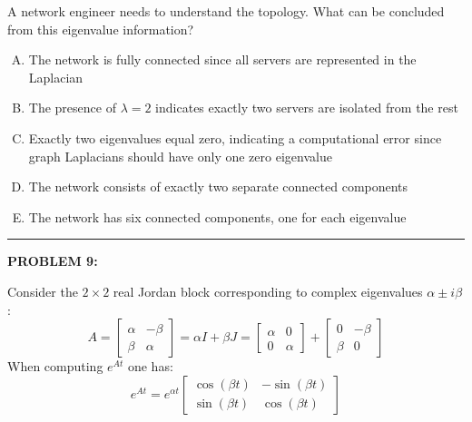 \documentclass[12pt]{amsart}
\newcommand{\divider}{
  \vspace{-1em} %
  \noindent
  \raisebox{-0.15ex}{\textbullet}%
  \hspace{0.5em}%
  \rule[0.5ex]{0.95\textwidth}{1.0pt}%
  \hspace{0.5em}%
  \raisebox{-0.15ex}{\textbullet}%
  \vspace{0em} %
}
\begin{document}
A network engineer needs to understand the topology. What can be concluded from this eigenvalue information?

\begin{enumerate}[(A)]
\item The network is fully connected since all servers are represented in the Laplacian
\item The presence of $\lambda = 2$ indicates exactly two servers are isolated from the rest
\item Exactly two eigenvalues equal zero, indicating a computational error since graph Laplacians should have only one zero eigenvalue
\item The network consists of exactly two separate connected components
\item The network has six connected components, one for each eigenvalue
\end{enumerate}


\divider

{\bf PROBLEM 9:}

Consider the $2 \times 2$ real Jordan block corresponding to complex eigenvalues $\alpha \pm i\beta$:
$$A = \begin{bmatrix} \alpha & -\beta \\ \beta & \alpha \end{bmatrix} = \alpha I + \beta J = \begin{bmatrix} \alpha & 0 \\ 0 & \alpha \end{bmatrix} +
\begin{bmatrix} 0 & -\beta \\ \beta & 0 \end{bmatrix}$$
%
When computing $e^{At}$ one has:
$$e^{At} = e^{\alpha t}\begin{bmatrix} \cos(\beta t) & -\sin(\beta t) \\ \sin(\beta t) & \cos(\beta t) \end{bmatrix}$$
\end{document}
